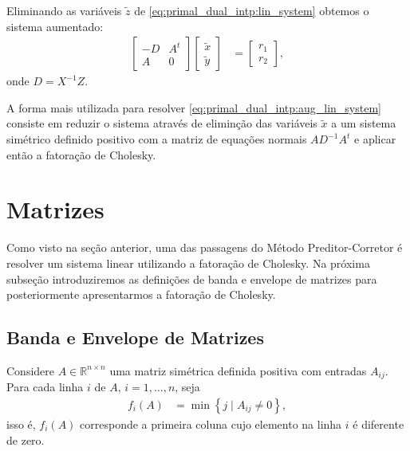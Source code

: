 Eliminando as variáveis $\tilde{z}$ de \eqref{eq:primal_dual_intp:lin_system}
obtemos o sistema aumentado:
\begin{align}
    \begin{bmatrix}
        -D & A^t \\
        A & 0
    \end{bmatrix} \begin{bmatrix}
        \tilde{x} \\
        \tilde{y}
    \end{bmatrix} &= \begin{bmatrix}
        r_1 \\
        r_2
    \end{bmatrix},
    \label{eq:primal_dual_intp:aug_lin_system}
\end{align}
onde $D = X^{-1} Z$.

A forma mais utilizada para resolver \eqref{eq:primal_dual_intp:aug_lin_system}
consiste em reduzir o sistema através de eliminção das variáveis $\tilde{x}$ a
um sistema simétrico definido positivo com a matriz de equações normais $A
D^{-1} A^t$ e aplicar então a fatoração de Cholesky.

\section{Matrizes}
Como visto na seção anterior, uma das passagens do Método Preditor-Corretor é
resolver um sistema linear utilizando a fatoração de Cholesky. Na próxima
subseção introduziremos as definições de banda e envelope de matrizes para
posteriormente apresentarmos a fatoração de Cholesky.

\subsection{Banda e Envelope de Matrizes}
Considere $A \in \mathbb{R}^{n \times n}$ uma matriz simétrica definida positiva
com entradas $A_{ij}$. Para cada linha $i$ de $A$, $i = 1, \ldots, n$, seja
\begin{align*}
    f_i(A) &= \min\left\{ j \mid A_{ij} \neq 0 \right\},
\end{align*}
isso é, $f_i(A)$ corresponde a primeira coluna cujo elemento na linha $i$ é
diferente de zero.

